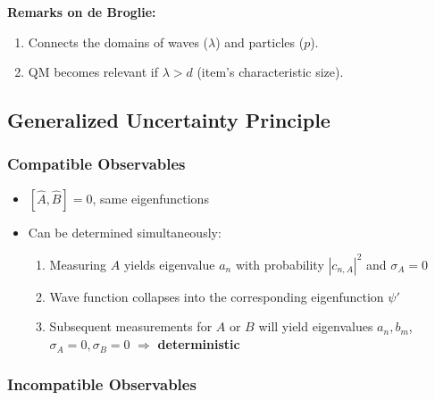 

\textbf{Remarks on de Broglie:}
\begin{enumerate}
    \item Connects the domains of waves ($\lambda$) and particles ($p$).
    \item QM becomes relevant if $\lambda>d$ (item's characteristic size).
\end{enumerate}

\subsection{Generalized Uncertainty Principle}
\subsubsection{Compatible Observables}

\begin{itemize}
    \item $[\widehat{A}, \widehat{B}] = 0$, same eigenfunctions
    \item Can be determined simultaneously:
          \begin{enumerate}
              \item Measuring $A$ yields eigenvalue $a_n$ with probability $|c_{n,A}|^2$ and $\sigma_A=0$
              \item Wave function collapses into the corresponding eigenfunction $\psi'$
              \item Subsequent measurements for $A$ or $B$ will yield eigenvalues $a_n, b_m$, $\sigma_A=0, \sigma_B=0$ $\Rightarrow$ \textbf{deterministic}
          \end{enumerate}
\end{itemize}

\subsubsection{Incompatible Observables}

